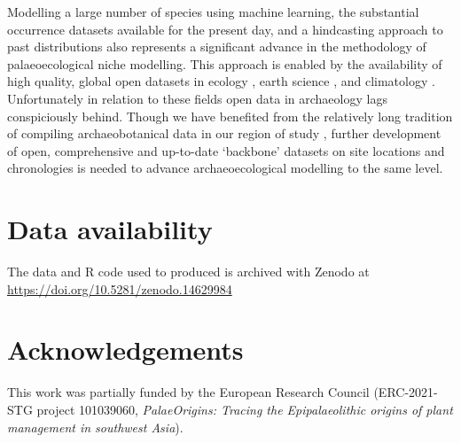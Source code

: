 \documentclass[
  authoryear,
  preprint]{elsarticle}
\begin{document}
Modelling a large number of species using machine learning, the
substantial occurrence datasets available for the present day, and a
hindcasting approach to past distributions also represents a significant
advance in the methodology of palaeoecological niche modelling. This
approach is enabled by the availability of high quality, global open
datasets in ecology \citep{GBIF2025, GBIFSecretariat2023}, earth science
\citep{SRTM}, and climatology \citep{KargerEtAl2017, BrownEtAl2018}.
Unfortunately in relation to these fields open data in archaeology lags
conspiciously behind. Though we have benefited from the relatively long
tradition of compiling archaeobotanical data in our region of study
\citep{ColledgeEtAl2004, ShennanConolly2007, ADEMNES, LucasFuller2018, FullerEtAl2018, WallaceEtAl2018, ORIGINS},
further development of open, comprehensive and up-to-date `backbone'
datasets on site locations and chronologies is needed to advance
archaeoecological modelling to the same level.

\section{Data availability}\label{data-availability}

The data and R code used to produced is archived with Zenodo at
\url{https://doi.org/10.5281/zenodo.14629984}

\section{Acknowledgements}\label{acknowledgements}

This work was partially funded by the European Research Council
(ERC-2021-STG project 101039060, \emph{PalaeOrigins: Tracing the
Epipalaeolithic origins of plant management in southwest Asia}).


\renewcommand\refname{References}
  
\end{document}
